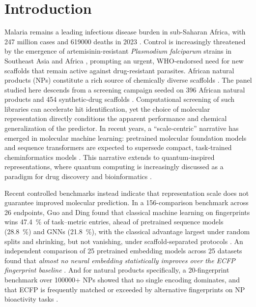 \documentclass[11pt,a4paper]{article}
\begin{document}
\section{Introduction}

Malaria remains a leading infectious disease burden in sub-Saharan Africa, with \num{247} million cases and \num{619000} deaths in \num{2023} \citep{who2024malariareport}. Control is increasingly threatened by the emergence of artemisinin-resistant \emph{Plasmodium falciparum} strains in Southeast Asia and Africa \citep{ariyey2014,ashley2018}, prompting an urgent, WHO-endorsed need for new scaffolds that remain active against drug-resistant parasites. African natural products (NPs) constitute a rich source of chemically diverse scaffolds \citep{anpdb_2026,value_addition_african_np_2025}. The panel studied here descends from a screening campaign seeded on \num{396} African natural products and \num{454} synthetic-drug scaffolds \citep{temgoua2026antimalarial}. Computational screening of such libraries can accelerate hit identification, yet the choice of molecular representation directly conditions the apparent performance and chemical generalization of the predictor. In recent years, a ``scale-centric'' narrative has emerged in molecular machine learning: pretrained molecular foundation models and sequence transformers are expected to supersede compact, task-trained cheminformatics models \citep{mol_tdl_2026,tn_efficient_2026}. This narrative extends to quantum-inspired representations, where quantum computing is increasingly discussed as a paradigm for drug discovery and bioinformatics \citep{naleczcharkiewicz2024,kumar2024quantumdrug}.

Recent controlled benchmarks instead indicate that representation scale does not guarantee improved molecular prediction. In a \num{156}-comparison benchmark across \num{26} endpoints, Guo and Ding found that classical machine learning on fingerprints wins \qty{47.4}{\percent} of task--metric entries, ahead of pretrained sequence models (\qty{28.8}{\percent}) and GNNs (\qty{21.8}{\percent}), with the classical advantage largest under random splits and shrinking, but not vanishing, under scaffold-separated protocols \citep{guo_ding_2026}. An independent comparison of \num{25} pretrained embedding models across \num{25} datasets found that \emph{almost no neural embedding statistically improves over the ECFP fingerprint baseline} \citep{benchmark_pretrained_2025}. And for natural products specifically, a \num{20}-fingerprint benchmark over \num{100000}+ NPs showed that no single encoding dominates, and that ECFP is frequently matched or exceeded by alternative fingerprints on NP bioactivity tasks \citep{boldini2024}.
\end{document}
